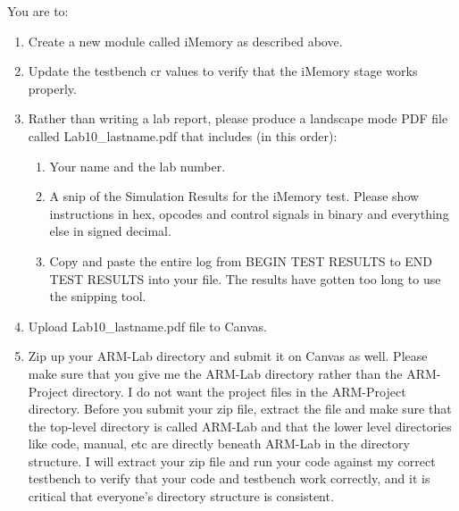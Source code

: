 You are to:
\begin{enumerate}
\item Create a new module called iMemory as described above.
\item Update the testbench cr values to verify that the iMemory stage works properly. 
\item Rather than writing a lab report, please produce a landscape mode PDF file called Lab10\_lastname.pdf that includes (in this order):
\begin{enumerate}
	\item Your name and the lab number.
	\item A snip of the Simulation Results for the iMemory test.  Please show instructions in hex, opcodes and control signals in binary and everything else in signed decimal.  
	\item Copy and paste the entire log from BEGIN TEST RESULTS to END TEST RESULTS into your file.  The results have gotten too long to use the snipping tool.	
\end{enumerate}
\item Upload Lab10\_lastname.pdf file to Canvas.
\item Zip up your ARM-Lab directory and submit it on Canvas as well.  Please make sure that you give me the ARM-Lab directory rather than the ARM-Project directory.  I do not want the project files in the ARM-Project directory.  Before you submit your zip file, extract the file and make sure that the top-level directory is called ARM-Lab and that the lower level directories like code, manual, etc are directly beneath ARM-Lab in the directory structure.  I will extract your zip file and run your code against my correct testbench to verify that your code and testbench work correctly, and it is critical that everyone's directory structure is consistent.
\end{enumerate} 